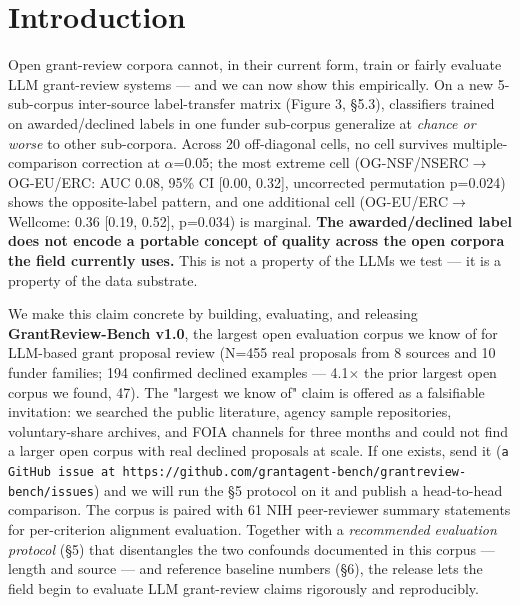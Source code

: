 \documentclass[11pt]{article}
\begin{document}
\section{Introduction}

Open grant-review corpora cannot, in their current form, train or fairly evaluate LLM grant-review systems --- and we can now show this empirically. On a new 5-sub-corpus inter-source label-transfer matrix (Figure 3, §5.3), classifiers trained on awarded/declined labels in one funder sub-corpus generalize at \emph{chance or worse} to other sub-corpora. Across 20 off-diagonal cells, no cell survives multiple-comparison correction at $\alpha$=0.05; the most extreme cell (OG-NSF/NSERC$\rightarrow$OG-EU/ERC: AUC 0.08, 95\% CI [0.00, 0.32], uncorrected permutation p=0.024) shows the opposite-label pattern, and one additional cell (OG-EU/ERC$\rightarrow$Wellcome: 0.36 [0.19, 0.52], p=0.034) is marginal. \textbf{The awarded/declined label does not encode a portable concept of quality across the open corpora the field currently uses.} This is not a property of the LLMs we test --- it is a property of the data substrate.

We make this claim concrete by building, evaluating, and releasing \textbf{GrantReview-Bench v1.0}, the largest open evaluation corpus we know of for LLM-based grant proposal review (N=455 real proposals from 8 sources and 10 funder families; 194 confirmed declined examples --- 4.1$\times$ the prior largest open corpus we found, 47). The "largest we know of" claim is offered as a falsifiable invitation: we searched the public literature, agency sample repositories, voluntary-share archives, and FOIA channels for three months and could not find a larger open corpus with real declined proposals at scale. If one exists, send it (\texttt{a GitHub issue at https://github.com/grantagent-bench/grantreview-bench/issues}) and we will run the §5 protocol on it and publish a head-to-head comparison. The corpus is paired with 61 NIH peer-reviewer summary statements for per-criterion alignment evaluation. Together with a \emph{recommended evaluation protocol} (§5) that disentangles the two confounds documented in this corpus --- length and source --- and reference baseline numbers (§6), the release lets the field begin to evaluate LLM grant-review claims rigorously and reproducibly.
\end{document}
